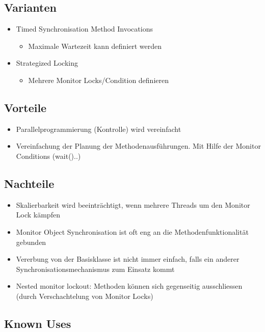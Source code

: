 \subsection*{Varianten}

\begin{itemize}
	\item Timed Synchronisation Method Invocations
	\begin{itemize}
		\item Maximale Wartezeit kann definiert werden
	\end{itemize}
	\item Strategized Locking
	\begin{itemize}
		\item Mehrere Monitor Locks/Condition definieren
	\end{itemize}
\end{itemize}

\subsection*{Vorteile}


\begin{itemize}
	\item Parallelprogrammierung (Kontrolle) wird vereinfacht
	\item Vereinfachung der Planung der Methodenausführungen. Mit Hilfe der Monitor Conditions (wait()..)
\end{itemize}

\subsection*{Nachteile}


\begin{itemize}
	\item Skalierbarkeit wird beeinträchtigt, wenn mehrere Threads um den Monitor Lock kämpfen
	\item Monitor Object Synchronisation ist oft eng an die Methodenfunktionalität gebunden
	\item Vererbung von der Basisklasse ist nicht immer einfach, falls ein anderer Synchronisationsmechanismus zum Einsatz kommt
	\item Nested monitor lockout: Methoden können sich gegenseitig ausschliessen (durch Verschachtelung von Monitor Locks)
\end{itemize}

\subsection*{Known Uses}


